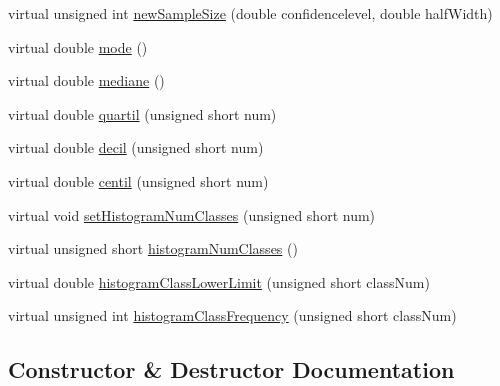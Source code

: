 \begin{DoxyCompactItemize}
\item 
virtual unsigned int \hyperlink{class_statistics_data_file_dummy_impl_a1e1ef519e92e4ebbc377ea2ad260594f}{new\+Sample\+Size} (double confidencelevel, double half\+Width)
\item 
virtual double \hyperlink{class_statistics_data_file_dummy_impl_a0822dbf015743b0ea9eab348eaeba72f}{mode} ()
\item 
virtual double \hyperlink{class_statistics_data_file_dummy_impl_a33bc3e5354c8bd5a877337b25c81cebb}{mediane} ()
\item 
virtual double \hyperlink{class_statistics_data_file_dummy_impl_a19a143111fbf8c9cef386f0a0400b81d}{quartil} (unsigned short num)
\item 
virtual double \hyperlink{class_statistics_data_file_dummy_impl_abbd9ae1aa84f608c110dcd47f181a62b}{decil} (unsigned short num)
\item 
virtual double \hyperlink{class_statistics_data_file_dummy_impl_a6eeda99bcdd189a59791620082276ebd}{centil} (unsigned short num)
\item 
virtual void \hyperlink{class_statistics_data_file_dummy_impl_a72bdcd13aa3af7b86352d988de30d710}{set\+Histogram\+Num\+Classes} (unsigned short num)
\item 
virtual unsigned short \hyperlink{class_statistics_data_file_dummy_impl_a872264d63fe904c48d0698a6ce147b37}{histogram\+Num\+Classes} ()
\item 
virtual double \hyperlink{class_statistics_data_file_dummy_impl_ac4f3ece197081ce2759ac5ff3a5e801f}{histogram\+Class\+Lower\+Limit} (unsigned short class\+Num)
\item 
virtual unsigned int \hyperlink{class_statistics_data_file_dummy_impl_a405fbbce36b568881228e9cd3b8d3104}{histogram\+Class\+Frequency} (unsigned short class\+Num)
\end{DoxyCompactItemize}


\subsection{Constructor \& Destructor Documentation}
